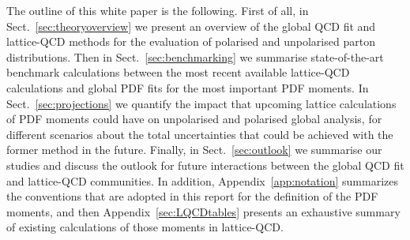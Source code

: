 The outline of this white paper is the following.
%
First of all, in Sect.~\ref{sec:theoryoverview} we present an overview of
the global QCD fit and lattice-QCD methods for the evaluation
of polarised and unpolarised parton distributions.
%
Then in Sect.~\ref{sec:benchmarking}
we summarise state-of-the-art benchmark
calculations between the most
recent available lattice-QCD calculations and global PDF fits
for the most important PDF moments.
%
In Sect.~\ref{sec:projections} we quantify the impact that
upcoming lattice calculations of PDF moments could have on unpolarised
and polarised global analysis, for different scenarios
about the total uncertainties that could be achieved with the former
method in the future.
%
Finally, in Sect.~\ref{sec:outlook} we summarise our studies
and discuss the outlook for future interactions between
the global QCD fit and lattice-QCD communities.
%
In addition, Appendix~\ref{app:notation} summarizes the conventions
that are adopted in this report for the definition of the PDF
moments, and then
Appendix~\ref{sec:LQCDtables} presents an exhaustive summary of existing calculations
of those moments in lattice-QCD.
